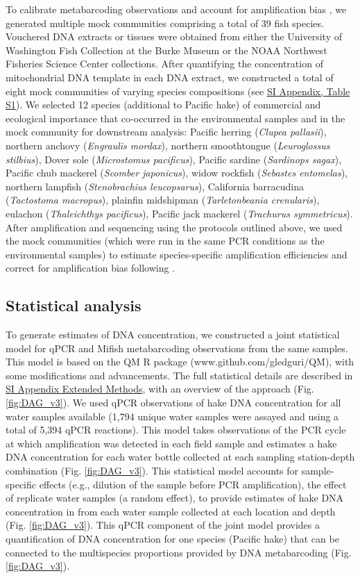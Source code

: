 \documentclass{article}
\begin{document}
To calibrate metabarcoding observations and account for amplification bias \cite{shelton2023,gold2023}, we generated multiple mock communities comprising a total of 39 fish species. Vouchered DNA extracts or tissues were obtained from either the University of Washington Fish Collection at the Burke Museum or the NOAA Northwest Fisheries Science Center collections. After quantifying the concentration of mitochondrial DNA template in each DNA extract, we constructed a total of eight mock communities of varying species compositions (see \href{SI_Appendix.pdf}{SI Appendix, Table S1}). We selected 12 species (additional to Pacific hake) of commercial and ecological importance that co-occurred in the environmental samples and in the mock community for downstream analysis: Pacific herring (\textit{Clupea pallasii}), northern anchovy (\textit{Engraulis mordax}), northern smoothtongue (\textit{Leuroglossus stilbius}), Dover sole (\textit{Microstomus pacificus}), Pacific sardine (\textit{Sardinops sagax}), Pacific chub mackerel (\textit{Scomber japonicus}), widow rockfish (\textit{Sebastes entomelas}), northern lampfish (\textit{Stenobrachius leucopsarus}), California barracudina (\textit{Tactostoma macropus}), plainfin midshipman (\textit{Tarletonbeania crenularis}), eulachon (\textit{Thaleichthys pacificus}), Pacific jack mackerel (\textit{Trachurus symmetricus}). After amplification and sequencing using the protocols outlined above, we used the mock communities (which were run in the same PCR conditions as the environmental samples) to estimate species-specific amplification efficiencies and correct for amplification bias following \cite{shelton2023}.

\subsection*{Statistical analysis}
To generate estimates of DNA concentration, we constructed a joint statistical model for qPCR and Mifish metabarcoding observations from the same samples. This model is based on the QM R package (www.github.com/gledguri/QM), with some modifications and advancements. The full statistical details are described in \href{SI_Appendix.pdf}{SI Appendix Extended Methods}, with an overview of the approach (Fig. \ref{fig:DAG_v3}). We used qPCR observations of hake DNA concentration for all water samples available (1,794 unique water samples were assayed and using a total of 5,394 qPCR reactions). This model takes observations of the PCR cycle at which amplification was detected in each field sample and estimates a hake DNA concentration for each water bottle collected at each sampling station-depth combination (Fig. \ref{fig:DAG_v3}). This statistical model accounts for sample-specific effects (e.g., dilution of the sample before PCR amplification), the effect of replicate water samples (a random effect), to provide estimates of hake DNA concentration in from each water sample collected at each location and depth (Fig. \ref{fig:DAG_v3}). This qPCR component of the joint model provides a quantification of DNA concentration for one species (Pacific hake) that can be connected to the multispecies proportions provided by DNA metabarcoding (Fig. \ref{fig:DAG_v3}).
\end{document}
